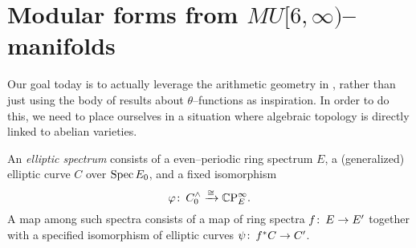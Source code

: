 











\section{Modular forms from $MU[6, \infty)$--manifolds}

Our goal today is to actually leverage the arithmetic geometry in , rather than just using the body of results about $\theta$--functions as inspiration.  In order to do this, we need to place ourselves in a situation where algebraic topology is directly linked to abelian varieties.

\begin{definition}\label{DefnEllipticSpectrum}
An \textit{elliptic spectrum} consists of a even--periodic ring spectrum $E$, a (generalized) elliptic curve $C$ over $\operatorname{Spec} E_0$, and a fixed isomorphism \[\varphi\colon\thinspace C^\wedge_0 \xrightarrow{\cong} \mathbb{C}\mathrm P^\infty_E.\]  A map among such spectra consists of a map of ring spectra $f\colon\thinspace E \to E'$ together with a specified isomorphism of elliptic curves $\psi\colon\thinspace f^* C \to C'$.
\end{definition}

